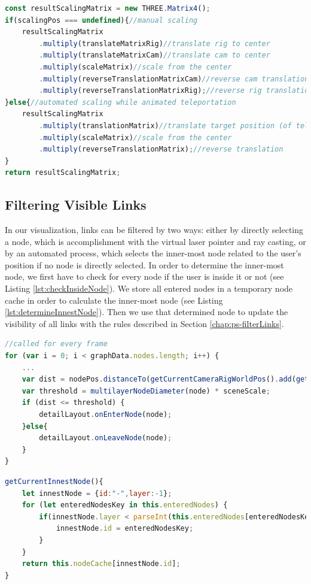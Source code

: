 \begin{lstlisting}[language=JavaScript,label={lst:scaling},caption=Simplified algorithm for calculating the scaling matrix]
const resultScalingMatrix = new THREE.Matrix4();
if(scalingPos === undefined){//manual scaling
    resultScalingMatrix
        .multiply(translateMatrixRig)//translate rig to center
        .multiply(translateMatrixCam)//translate cam to center
        .multiply(scaleMatrix)//scale from the center
        .multiply(reverseTranslationMatrixCam)//reverse cam translation
        .multiply(reverseTranslationMatrixRig);//reverse rig translation
}else{//automated scaling while animated teleportation
    resultScalingMatrix
        .multiply(translationMatrix)//translate target position (of teleport) to center
        .multiply(scaleMatrix)//scale from the center
        .multiply(reverseTranslationMatrix);//reverse translation
}
return resultScalingMatrix;
\end{lstlisting}

\pagebreak

\subsection{Filtering Visible Links}
\label{sec:linkFiltering}

In our visualization, links can be filtered by two ways: either by directly selecting a node, which is accomplishment with the virtual laser pointer and ray casting, or by an automated process, which selects the inner-most node related to the user's position if no node is directly selected.
In order to determine the inner-most node, we first have to check for every node if the user is inside it or not (see Listing \ref{lst:checkInsideNode}). We store all entered nodes in a temporary node cache in order to calculate the inner-most node (see Listing \ref{lst:determineInnestNode}).
Then we use that determined node to update the visibility of all links with the rules described in Section \ref{chap:ps-filterLinks}.

\begin{lstlisting}[language=JavaScript,label={lst:checkInsideNode},caption=Simplified algorithm to determine whenether the user is inside a node or not.]
//called for every frame
for (var i = 0; i < graphData.nodes.length; i++) {
    ...
    var dist = nodePos.distanceTo(getCurrentCameraRigWorldPos().add(getRelativeCameraToRigPos()));
    var threshold = multilayerNodeDiameter(node) * sceneScale;
    if (dist <= threshold) {
        detailLayout.onEnterNode(node);
    }else{
        detailLayout.onLeaveNode(node);
    }
}
\end{lstlisting}


\begin{lstlisting}[language=JavaScript,label={lst:determineInnestNode},caption=Simplified algorithm to determine the inner most node.] 
getCurrentInnestNode(){
    let innestNode = {id:"-",layer:-1};
    for (let enteredNodesKey in this.enteredNodes) {
        if(innestNode.layer < parseInt(this.enteredNodes[enteredNodesKey])){
            innestNode.id = enteredNodesKey;
        }
    }
    return this.nodeCache[innestNode.id];
}
\end{lstlisting}
